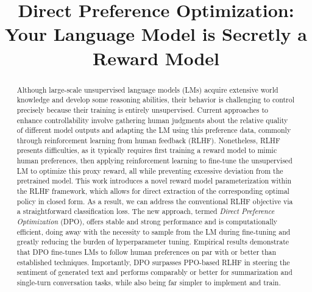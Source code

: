 \title{Direct Preference Optimization: Your Language Model is Secretly a Reward Model}

\begin{abstract}
Although large-scale unsupervised language models (LMs) acquire extensive world knowledge and develop some reasoning abilities, their behavior is challenging to control precisely because their training is entirely unsupervised. Current approaches to enhance controllability involve gathering human judgments about the relative quality of different model outputs and adapting the LM using this preference data, commonly through reinforcement learning from human feedback (RLHF). Nonetheless, RLHF presents difficulties, as it typically requires first training a reward model to mimic human preferences, then applying reinforcement learning to fine-tune the unsupervised LM to optimize this proxy reward, all while preventing excessive deviation from the pretrained model. This work introduces a novel reward model parameterization within the RLHF framework, which allows for direct extraction of the corresponding optimal policy in closed form. As a result, we can address the conventional RLHF objective via a straightforward classification loss. The new approach, termed \textit{Direct Preference Optimization} (DPO), offers stable and strong performance and is computationally efficient, doing away with the necessity to sample from the LM during fine-tuning and greatly reducing the burden of hyperparameter tuning. Empirical results demonstrate that DPO fine-tunes LMs to follow human preferences on par with or better than established techniques. Importantly, DPO surpasses PPO-based RLHF in steering the sentiment of generated text and performs comparably or better for summarization and single-turn conversation tasks, while also being far simpler to implement and train.
\end{abstract}

